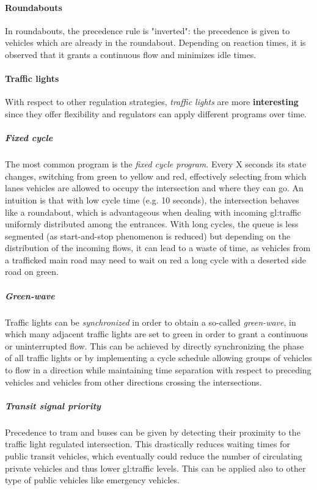 \paragraph{Roundabouts}

In roundabouts, the precedence rule is "inverted": the precedence is given to vehicles which are already in the roundabout. Depending on reaction times, it is observed that it grants a continuous flow and minimizes idle times.

\paragraph{Traffic lights}

With respect to other regulation strategies, \textit{traffic lights} are more \textbf{interesting} since they offer flexibility and regulators can apply different programs over time.

\subparagraph{Fixed cycle}

The most common program is the \textit{fixed cycle program}. Every X seconds its state changes, switching from green to yellow and red, effectively selecting from which lanes vehicles are allowed to occupy the intersection and where they can go. An intuition is that with low cycle time (e.g. 10 seconds), the intersection behaves like a roundabout, which is advantageous when dealing with incoming \gls{gl:traffic} uniformly distributed among the entrances. With long cycles, the queue is less segmented (as start-and-stop phenomenon is reduced) but depending on the distribution of the incoming flows, it can lead to a waste of time, as vehicles from a trafficked main road may need to wait on red a long cycle with a deserted side road on green.

\subparagraph{Green-wave}

Traffic lights can be \textit{synchronized} in order to obtain a so-called \textit{green-wave}, in which many adjacent traffic lights are set to green in order to grant a continuous or uninterrupted flow. This can be achieved by directly synchronizing the phase of all traffic lights or by implementing a cycle schedule allowing groups of vehicles to flow in a direction while maintaining time separation with respect to preceding vehicles and vehicles from other directions crossing the intersections.

\subparagraph{Transit signal priority}

Precedence to tram and buses can be given by detecting their proximity to the traffic light regulated intersection. This drastically reduces waiting times for public transit vehicles, which eventually could reduce the number of circulating private vehicles and thus lower \gls{gl:traffic} levels. This can be applied also to other type of public vehicles like emergency vehicles.

